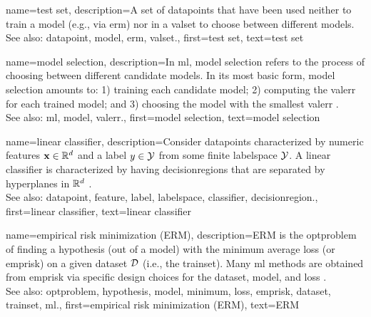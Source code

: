 {name={test set},
	description={A set of \glspl{datapoint} that have  
		been used neither to train a \gls{model} (e.g., via \gls{erm}) nor in a \gls{valset} 
		to choose between different \glspl{model}.
				\\
		See also: \gls{datapoint}, \gls{model}, \gls{erm}, \gls{valset}.},
	first={test set},
	text={test set}  
}


{name={model selection},
	description={In \gls{ml}, \gls{model} selection refers to the 
		process of choosing between different candidate \glspl{model}. In its most 
		basic form, \gls{model} selection amounts to: 1) training each candidate \gls{model}; 
		2) computing the \gls{valerr} for each trained \gls{model}; and 3) choosing the \gls{model} 
		with the smallest \gls{valerr} \cite[Ch. 6]{MLBasics}. 
				\\
		See also: \gls{ml}, \gls{model}, \gls{valerr}.},
	first={model selection},
	text={model selection}  
}


{name={linear classifier}, 
	description={Consider \glspl{datapoint} characterized by numeric \glspl{feature} ${\bf x} \in \mathbb{R}^{d}$ 
	    	and a \gls{label} $y \in \mathcal{Y}$ from some finite \gls{labelspace} $\mathcal{Y}$. 
		A linear \gls{classifier} is characterized by having \glspl{decisionregion} that are 
		separated by hyperplanes in $\mathbb{R}^{d}$ \cite[Ch. 2]{MLBasics}.
				\\
		See also: \gls{datapoint}, \gls{feature}, \gls{label}, \gls{labelspace}, \gls{classifier}, \gls{decisionregion}.},
	first={linear classifier},
	text={linear classifier} 
}


{name={empirical risk minimization (ERM)}, 
	description={ERM is the \gls{optproblem} of finding 
		a \gls{hypothesis} (out of a \gls{model}) with the \gls{minimum} average \gls{loss} (or \gls{emprisk}) on a given \gls{dataset} 
		$\mathcal{D}$ (i.e., the \gls{trainset}). Many \gls{ml} methods are obtained from 
		\gls{emprisk} via specific design choices for the \gls{dataset}, \gls{model}, and \gls{loss} \cite[Ch. 3]{MLBasics}.
				\\
		See also: \gls{optproblem}, \gls{hypothesis}, \gls{model}, \gls{minimum}, \gls{loss}, \gls{emprisk}, \gls{dataset}, \gls{trainset}, \gls{ml}.},
	first={empirical risk minimization (ERM)},
	text={ERM} 
}


